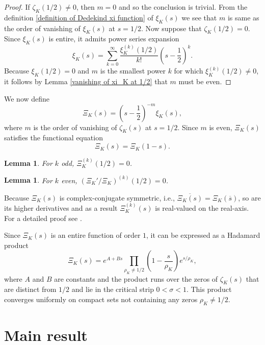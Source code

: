 \documentclass[12pt]{amsart}
\numberwithin{equation}{section}
\theoremstyle{myplain}
\theoremstyle{mydefinition}
\theoremstyle{plain}
\newtheorem{lemma}[theorem]{Lemma}
\theoremstyle{definition}
\begin{document}
\begin{proof}
If $\zeta_K(1/2) \neq 0$, then $m = 0$ and so the conclusion is trivial. From the definition \eqref{definition of Dedekind xi function} of $\xi_K(s)$ we see that $m$ is same as the order of vanishing of $\xi_K(s)$ at $s = 1/2$.  Now suppose that $\zeta_K(1/2) = 0$. Since $\xi_K(s)$ is entire, it admits power series expansion 
\[
\xi_K(s) = \sum_{k = 0}^{\infty} \frac{\xi_K^{(k)}(1/2)}{k!} \left(s - \frac{1}{2} \right)^{k}.
\]
Because $\xi_K(1/2) = 0$ and $m$ is the smallest power $k$ for which $\xi_K^{(k)}(1/2) \neq 0$, it follows by Lemma \ref{vanishing of xi_K at 1/2} that $m$ must be even.
\end{proof}


We now define
\[
\Xi_K(s) = \left(s - \frac{1}{2} \right)^{-m} \xi_K(s),
\]
where $m$ is the order of vanishing of $\zeta_K(s)$ at $s = 1/2$. Since $m$ is even, $\Xi_K(s)$ satisfies the functional equation 
\[
\Xi_K(s) = \Xi_K(1-s).
\]


\begin{lemma}
For $k$ odd, $\Xi_K^{(k)}(1/2) = 0$.
\end{lemma}


\begin{lemma} \label{vanishing of X_K at 1/2} 
For $k$ even, $(\Xi_K'/\Xi_K)^{(k)}(1/2) = 0$.
\end{lemma}

Because $\Xi_K(s)$ is complex-conjugate symmetric, i.e., $\overline{\Xi_K(s)} = \Xi_K(\overline{s})$, so are its higher derivatives and as a result $\Xi_K^{(k)}(s)$ is real-valued on the real-axis. For a detailed proof see \cite[Lem. 3]{nguyen2025some}.

Since $\Xi_K(s)$ is an entire function of order $1$, it can be expressed as a Hadamard product
\begin{equation} \label{hadamard product}
\Xi_K(s) = e^{A + Bs} \prod_{\rho_K \neq 1/2} \left( 1 - \frac{s}{\rho_K} \right) e^{s/\rho_K},
\end{equation}
where $A$ and $B$ are constants and the product runs over the zeros of $\zeta_K(s)$ that are distinct from $1/2$ and lie in the critical strip $0 < \sigma < 1$. This product converges uniformly on compact sets not containing any zeros $\rho_K \neq 1/2$.

\vspace{2pt}

\section{Main result}
\end{document}
